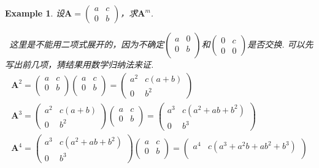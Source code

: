 \documentclass{article}
\newtheorem{example}[theorem]{Example}
\newcommand{\hints}{{\color{blue} \text{hints}}}
\newcommand{\mbf}[1]{\bm{#1}}
\begin{document}
\begin{example}
\rm 设$\mbf{A} = \begin{pmatrix}
a & c \\
0 & b
\end{pmatrix}$，求$\mbf{A}^m$. 


\hints\ 这里是不能用二项式展开的，因为不确定$\begin{pmatrix}
a & 0 \\
0 & b\\
\end{pmatrix}$和$\begin{pmatrix}
0 & c \\
0 & 0
\end{pmatrix}$是否交换. 可以先写出前几项，猜结果用数学归纳法来证. 
$$
\begin{array}{ll}
\mbf{A}^2 = \begin{pmatrix}
a & c \\
0 & b\\
\end{pmatrix}\begin{pmatrix}
a & c \\
0 & b\\
\end{pmatrix} = \begin{pmatrix}
a^2 & c(a+b) \\
0 & b^2 
\end{pmatrix} \\
 \mbf{A}^3 = \begin{pmatrix}
a^2 & c(a+b) \\
0 & b^2 
\end{pmatrix}\begin{pmatrix}
a & c \\
0 & b\\
\end{pmatrix} = \begin{pmatrix}
a^3 & c(a^2 + ab + b^2) \\
0 & b^3  
\end{pmatrix} \\
 \mbf{A}^4 = \begin{pmatrix}
a^3 & c(a^2 + ab + b^2) \\
0 & b^3  
\end{pmatrix}\begin{pmatrix}
a & c \\
0 & b\\
\end{pmatrix} = \begin{pmatrix}
a^4 & c(a^3 + a^2b + ab^2 + b^3) \\

\end{pmatrix}
\end{array}$$
\end{example}
\end{document}
